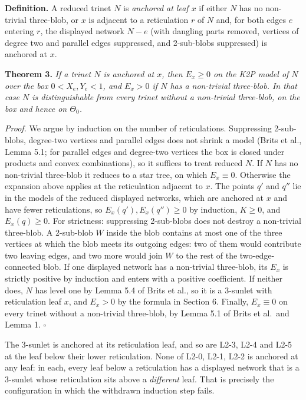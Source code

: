 \documentclass[
  11pt,
]{article}
\begin{document}
\textbf{Definition.} A reduced trinet \(N\) is \emph{anchored at leaf
\(x\)} if either \(N\) has no non-trivial three-blob, or \(x\) is
adjacent to a reticulation \(r\) of \(N\) and, for both edges \(e\)
entering \(r\), the displayed network \(N-e\) (with dangling parts
removed, vertices of degree two and parallel edges suppressed, and
2-sub-blobs suppressed) is anchored at \(x\).

\textbf{Theorem 3.} \emph{If a trinet \(N\) is anchored at \(x\), then
\(E_x \ge 0\) on the K2P model of \(N\) over the box \(0<X_e,Y_e<1\),
and \(E_x>0\) if \(N\) has a non-trivial three-blob. In that case \(N\)
is distinguishable from every trinet without a non-trivial three-blob,
on the box and hence on \(\Theta_0\).}

\emph{Proof.} We argue by induction on the number of reticulations.
Suppressing 2-sub-blobs, degree-two vertices and parallel edges does not
shrink a model (Brits et al., Lemma 5.1; for parallel edges and
degree-two vertices the box is closed under products and convex
combinations), so it suffices to treat reduced \(N\). If \(N\) has no
non-trivial three-blob it reduces to a star tree, on which
\(E_x \equiv 0\). Otherwise the expansion above applies at the
reticulation adjacent to \(x\). The points \(q'\) and \(q''\) lie in the
models of the reduced displayed networks, which are anchored at \(x\)
and have fewer reticulations, so \(E_x(q'), E_x(q'')\ge 0\) by
induction, \(K\ge0\), and \(E_x(q)\ge0\). For strictness: suppressing
2-sub-blobs does not destroy a non-trivial three-blob. A 2-sub-blob
\(W\) inside the blob contains at most one of the three vertices at
which the blob meets its outgoing edges: two of them would contribute
two leaving edges, and two more would join \(W\) to the rest of the
two-edge-connected blob. If one displayed network has a non-trivial
three-blob, its \(E_x\) is strictly positive by induction and enters
with a positive coefficient. If neither does, \(N\) has level one by
Lemma 5.4 of Brits et al., so it is a 3-sunlet with reticulation leaf
\(x\), and \(E_x>0\) by the formula in Section 6. Finally,
\(E_x\equiv0\) on every trinet without a non-trivial three-blob, by
Lemma 5.1 of Brits et al.~and Lemma 1. \(\square\)

The 3-sunlet is anchored at its reticulation leaf, and so are L2-3, L2-4
and L2-5 at the leaf below their lower reticulation. None of L2-0, L2-1,
L2-2 is anchored at any leaf: in each, every leaf below a reticulation
has a displayed network that is a 3-sunlet whose reticulation sits above
a \emph{different} leaf. That is precisely the configuration in which
the withdrawn induction step fails.
\end{document}
